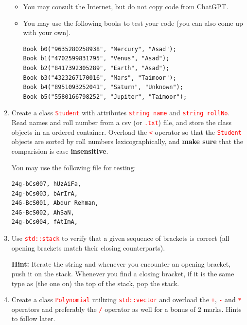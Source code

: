\documentclass[12pt]{article}
\begin{document}
\begin{enumerate}
\begin{itemize}
        \item You may consult the Internet, but do not copy code from ChatGPT.

        \item You may use the following books to test your code (you can also come up with your own). 

\begin{verbatim}
Book b0("9635280258938", "Mercury", "Asad");
Book b1("4702599831795", "Venus", "Asad");
Book b2("8417392305289", "Earth", "Asad");
Book b3("4323267170016", "Mars", "Taimoor");
Book b4("8951093252041", "Saturn", "Unknown");
Book b5("5580166798252", "Jupiter", "Taimoor");
\end{verbatim}

    \end{itemize}

    \item Create a class \textcolor{red}{\texttt{Student}} with attributes \textcolor{red}{\texttt{string name}} and \textcolor{red}{\texttt{string rollNo}}. Read names and roll number 
    from a csv (or \textcolor{red}{\texttt{.txt}}) file, and store the class objects in an ordered container. Overload the \textcolor{red}{\texttt{<}} operator so that the 
    \textcolor{red}{\texttt{Student}} objects are sorted by roll numbers lexicographically, and \textbf{make sure} that the comparision is case \textbf{insensitive}. 
    
    You may use the following file for testing:

\begin{verbatim}
24g-bCs007, hUzAiFa,
24g-bCs003, bArIrA,
24G-BcS001, Abdur Rehman,
24G-BcS002, AhSaN,
24g-bCs004, fAtImA,
\end{verbatim}

    \item Use \textcolor{red}{\texttt{std::stack}} to verify that a given sequence of brackets is correct 
    (all opening brackets match their closing counterparts).

    \textbf{Hint:} Iterate the string and whenever you encounter an opening bracket, push it on the stack. 
    Whenever you find a closing bracket, if it is the same type as (the one on) the top of the stack, pop the stack.

    \item Create a class \textcolor{red}{\texttt{Polynomial}} utilizing \textcolor{red}{\texttt{std::vector}} and overload the \textcolor{red}{\texttt{+}}, \textcolor{red}{\texttt{-}} and 
    \textcolor{red}{\texttt{*}} operators and preferably the \textcolor{red}{\texttt{/}} operator as well for a bonus of 2 marks. Hints to follow later.

\end{enumerate}
\end{document}
